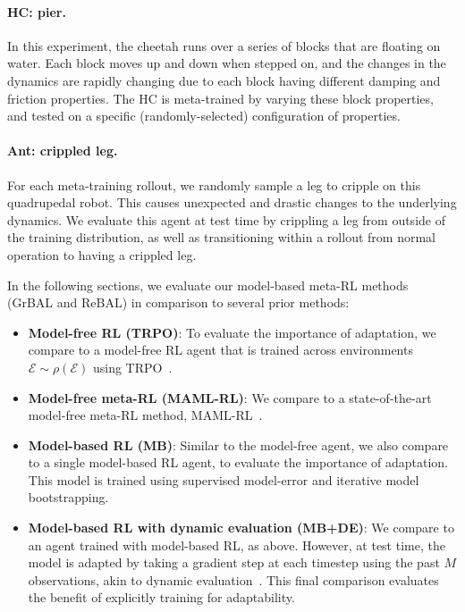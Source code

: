 \paragraph{HC: pier.} In this experiment, the cheetah runs over a series of blocks that are floating on water. Each block moves up and down when stepped on, and the changes in the dynamics are rapidly changing due to each block having different damping and friction properties. The HC is meta-trained by varying these block properties, and tested on a specific (randomly-selected) configuration of properties.

\paragraph{Ant: crippled leg.} For each meta-training rollout, we randomly sample a leg to cripple on this quadrupedal robot. This causes unexpected and drastic changes to the underlying dynamics. We evaluate this agent at test time by crippling a leg from outside of the training distribution, as well as transitioning within a rollout from normal operation to having a crippled leg.


In the following sections, we evaluate our model-based meta-RL methods (GrBAL and ReBAL) in comparison to several prior methods:
\begin{itemize}[leftmargin=*]
\item \textbf{Model-free RL (TRPO)}: To evaluate the importance of adaptation, we compare to a model-free RL agent that is trained across environments $\mathcal{E}\sim\rho(\mathcal{E})$ using TRPO~\citep{schulman2015trust}.
\item \textbf{Model-free meta-RL (MAML-RL)}: We compare to a state-of-the-art model-free meta-RL method, MAML-RL~\citep{finn2017maml}.
\item \textbf{Model-based RL (MB)}: Similar to the model-free agent, we also compare to a single model-based RL agent, to evaluate the importance of adaptation. This model is trained using supervised model-error and iterative model bootstrapping. %
\item \textbf{Model-based RL with dynamic evaluation (MB+DE)}: We compare to an agent trained with model-based RL, as above. However, at test time, the model is adapted by taking a gradient step at each timestep using the past $M$ observations, akin to dynamic evaluation~\citep{krause2017dynamiceval}. This final comparison evaluates the benefit of explicitly training for adaptability.
\end{itemize}

